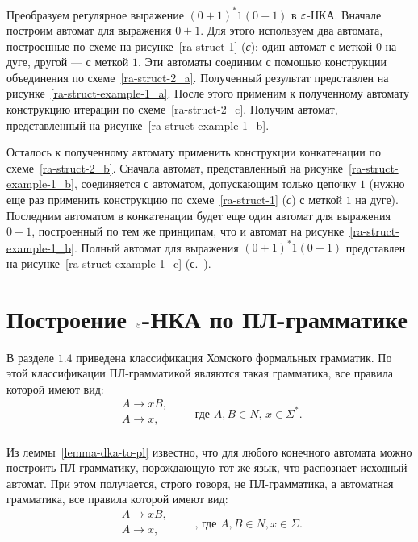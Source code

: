 

\begin{myexample}
Преобразуем регулярное выражение $(0 + 1)^*1(0 + 1)$ в $\varepsilon$-НКА. Вначале построим автомат для выражения $0 + 1$. Для этого используем два автомата, построенные по схеме на рисунке~\ref{ra-struct-1} (\textsl{с}): один автомат с меткой $0$ на дуге, другой --- с меткой $1$. Эти автоматы соединим с помощью конструкции объединения по схеме~\ref{ra-struct-2_a}. Полученный результат представлен на рисунке~\ref{ra-struct-example-1_a}. 
После этого применим к полученному автомату конструкцию итерации по схеме~\ref{ra-struct-2_c}. Получим автомат, представленный на рисунке~\ref{ra-struct-example-1_b}. 



Осталось к полученному автомату применить конструкции конкатенации по схеме~\ref{ra-struct-2_b}. Сначала автомат, представленный на рисунке~\ref{ra-struct-example-1_b}, соединяется с автоматом, допускающим только цепочку $1$ (нужно еще раз применить конструкцию по схеме~\ref{ra-struct-1} (\textsl{с}) с меткой $1$ на дуге). Последним автоматом в конкатенации будет еще один автомат для выражения $0 + 1$, построенный по тем же принципам, что и автомат на рисунке~\ref{ra-struct-example-1_b}.
Полный автомат для выражения $(0 + 1)^*1(0 + 1)$ представлен на рисунке~\ref{ra-struct-example-1_c} (с.~\pageref{ra-struct-example-1_c}).
\end{myexample}



\section{Построение $\varepsilon$-НКА по ПЛ-грамматике}
\label{Chapter4GramtoFA}

В разделе $1.4$ приведена классификация Хомского формальных грамматик. По этой классификации ПЛ-грамматикой являются такая грамматика, все правила которой имеют вид:
\[
	\begin{array}{l}
	A \to xB, \\
	A \to x, \\
	\end{array} \qquad \text{где $A,B \in N$, $x\in\Sigma^*$.}
\]


Из леммы~\ref{lemma-dka-to-pl} известно, что для любого конечного автомата можно построить ПЛ-грамматику, порождающую тот же язык, что распознает исходный автомат. При этом получается, строго говоря, не ПЛ-грамматика, а автоматная грамматика, все правила которой имеют вид:
\[
 \begin{array}{l}
	A \to xB, \\
	A \to x, \\
	\end{array}\qquad \text{, где $A,B \in N, x\in\Sigma$.}
\]

